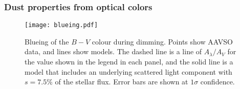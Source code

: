\documentclass[sn-nature]{sn-jnl}%
\begin{document}
\subsubsection*{Dust properties from optical colors}

\begin{figure}
    \centering
    \texttt{[image: blueing.pdf]}
    \caption{Blueing of the $B-V$ colour during dimming.
    Points show AAVSO data, and lines show models.
    The dashed line is a line of $A_\lambda/A_V$ for the value shown in the legend in each panel, and the solid line is a model that includes an underlying scattered light component with $s=7.5$\% of the stellar flux.
    Error bars are shown at $1\sigma$ confidence.
}
    \label{fig:blueing}
\end{figure}
\end{document}
